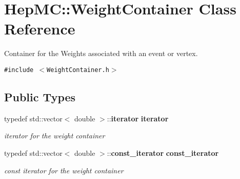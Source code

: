 \section{Hep\-MC::Weight\-Container Class Reference}
\label{classHepMC_1_1WeightContainer}
Container for the Weights associated with an event or vertex.  


{\tt \#include $<$Weight\-Container.h$>$}

\subsection*{Public Types}
\begin{CompactItemize}
\item 
typedef std::vector$<$ double $>$::{\bf iterator} {\bf iterator}
\begin{CompactList}\small\item\em iterator for the weight container \item\end{CompactList}\item 
typedef std::vector$<$ double $>$::{\bf const\_\-iterator} {\bf const\_\-iterator}
\begin{CompactList}\small\item\em const iterator for the weight container \item\end{CompactList}\end{CompactItemize}
